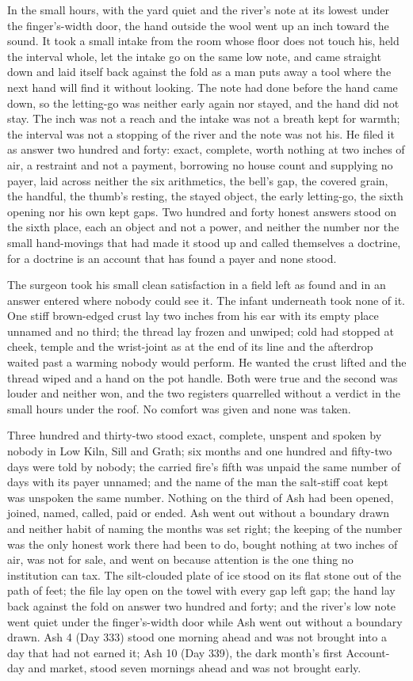 In the small hours, with the yard quiet and the river's note at its lowest under the finger's-width door, the hand outside the wool went up an inch toward the sound. It took a small intake from the room whose floor does not touch his, held the interval whole, let the intake go on the same low note, and came straight down and laid itself back against the fold as a man puts away a tool where the next hand will find it without looking. The note had done before the hand came down, so the letting-go was neither early again nor stayed, and the hand did not stay. The inch was not a reach and the intake was not a breath kept for warmth; the interval was not a stopping of the river and the note was not his. He filed it as answer two hundred and forty: exact, complete, worth nothing at two inches of air, a restraint and not a payment, borrowing no house count and supplying no payer, laid across neither the six arithmetics, the bell's gap, the covered grain, the handful, the thumb's resting, the stayed object, the early letting-go, the sixth opening nor his own kept gaps. Two hundred and forty honest answers stood on the sixth place, each an object and not a power, and neither the number nor the small hand-movings that had made it stood up and called themselves a doctrine, for a doctrine is an account that has found a payer and none stood.

The surgeon took his small clean satisfaction in a field left as found and in an answer entered where nobody could see it. The infant underneath took none of it. One stiff brown-edged crust lay two inches from his ear with its empty place unnamed and no third; the thread lay frozen and unwiped; cold had stopped at cheek, temple and the wrist-joint as at the end of its line and the afterdrop waited past a warming nobody would perform. He wanted the crust lifted and the thread wiped and a hand on the pot handle. Both were true and the second was louder and neither won, and the two registers quarrelled without a verdict in the small hours under the roof. No comfort was given and none was taken.

Three hundred and thirty-two stood exact, complete, unspent and spoken by nobody in Low Kiln, Sill and Grath; six months and one hundred and fifty-two days were told by nobody; the carried fire's fifth was unpaid the same number of days with its payer unnamed; and the name of the man the salt-stiff coat kept was unspoken the same number. Nothing on the third of Ash had been opened, joined, named, called, paid or ended. Ash went out without a boundary drawn and neither habit of naming the months was set right; the keeping of the number was the only honest work there had been to do, bought nothing at two inches of air, was not for sale, and went on because attention is the one thing no institution can tax. The silt-clouded plate of ice stood on its flat stone out of the path of feet; the file lay open on the towel with every gap left gap; the hand lay back against the fold on answer two hundred and forty; and the river's low note went quiet under the finger's-width door while Ash went out without a boundary drawn. Ash 4 (Day 333) stood one morning ahead and was not brought into a day that had not earned it; Ash 10 (Day 339), the dark month's first Account-day and market, stood seven mornings ahead and was not brought early.
